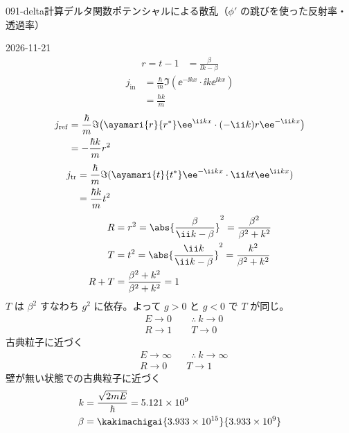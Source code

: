 \documentclass[uplatex,dvipdfmx,a4paper,11pt]{jsarticle}
\begin{document}
\begin{mondai}{091-delta}{計算}{デルタ関数ポテンシャルによる散乱（$\phi'$ の跳びを使った反射率・透過率）}
\begin{kotaeutsushi}{2026-11-21}
\begin{align*}
r=t-1&=\frac{\beta}{\ii k-\beta}
\end{align*}
\begin{align*}
j_{\mathrm{in}}&=\frac{\hbar}{m}\Im(\ee^{-\ii kx}\cdot\ii k\ee^{\ii kx})\\
&=\frac{\hbar k}{m}
\end{align*}
\begin{align*}
j_{\mathrm{ref}}&=\frac{\hbar}{m}\Im\bigl(\ayamari{r}{r^{*}}\ee^{\ii kx}\cdot(-\ii k)r\ee^{-\ii kx}\bigr)\\
&=-\frac{\hbar k}{m}r^{2}
\end{align*}
\begin{align*}
j_{\mathrm{tr}}&=\frac{\hbar}{m}\Im(\ayamari{t}{t^{*}}\ee^{-\ii kx}\cdot\ii kt\ee^{\ii kx})\\
&=\frac{\hbar k}{m}t^{2}
\end{align*}
\begin{align*}
R&=r^{2}=\abs{\frac{\beta}{\ii k-\beta}}^{2}=\frac{\beta^{2}}{\beta^{2}+k^{2}}\\
T&=t^{2}=\abs{\frac{\ii k}{\ii k-\beta}}^{2}=\frac{k^{2}}{\beta^{2}+k^{2}}\\
R+T&=\frac{\beta^{2}+k^{2}}{\beta^{2}+k^{2}}=1
\end{align*}
$T$ は $\beta^{2}$ すなわち $g^{2}$ に依存。よって $g>0$ と $g<0$ で $T$ が同じ。
\begin{align*}
&E\to0\qquad\therefore\ k\to0\\
&R\to1\qquad T\to0
\end{align*}
古典粒子に近づく
\begin{align*}
&E\to\infty\qquad\therefore\ k\to\infty\\
&R\to0\qquad T\to1
\end{align*}
壁が無い状態での古典粒子に近づく
\begin{align*}
k&=\frac{\sqrt{2mE}}{\hbar}=5.121\times10^{9}\\
\beta&=\kakimachigai{3.933\times10^{15}}{3.933\times10^{9}}
\end{align*}

\end{kotaeutsushi}
\end{mondai}
\end{document}
